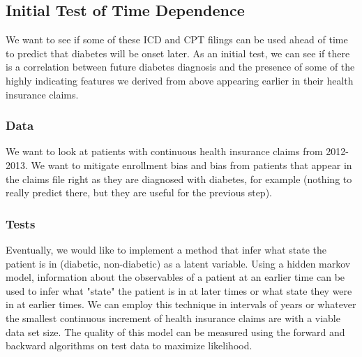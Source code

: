 \documentclass{article}
\begin{document}
\subsection{Initial Test of Time Dependence}

We want to see if some of these ICD and CPT filings can be used ahead of time to predict that diabetes will be onset later. As an initial test, we can see if there is a correlation between future diabetes diagnosis and the presence of some of the highly indicating features we derived from above appearing earlier in their health insurance claims.

\subsubsection{Data}

We want to look at patients with continuous health insurance claims from 2012-2013. We want to mitigate enrollment bias and bias from patients that appear in the claims file right as they are diagnosed with diabetes, for example (nothing to really predict there, but they are useful for the previous step). 

\subsubsection{Tests}

Eventually, we would like to implement a method that infer what state the patient is in (diabetic, non-diabetic) as a latent variable. Using a hidden markov model, information about the observables of a patient at an earlier time can be used to infer what "state" the patient is in at later times or what state they were in at earlier times. We can employ this technique in intervals of years or whatever the smallest continuous increment of health insurance claims are with a viable data set size.
The quality of this model can be measured using the forward and backward algorithms on test data to maximize likelihood.
\end{document}
